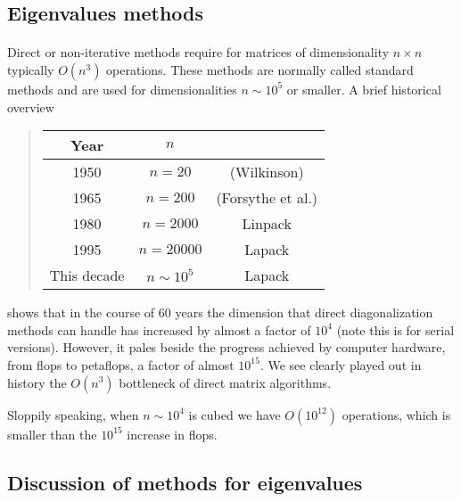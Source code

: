 \noindent



\subsection*{Eigenvalues methods}

\paragraph{}
Direct or non-iterative methods  require for matrices of dimensionality $n\times n$ typically $O(n^3)$ operations. These methods are normally called standard methods and are used for dimensionalities
$n \sim 10^5$ or smaller. A brief historical overview  


\begin{quote}
\begin{tabular}{ccc}
\hline
\multicolumn{1}{c}{ Year } & \multicolumn{1}{c}{ $n$ } & \multicolumn{1}{c}{  } \\
\hline
1950        & $n=20$       & (Wilkinson)       \\
1965        & $n=200$      & (Forsythe et al.) \\
1980        & $n=2000$     & Linpack           \\
1995        & $n=20000$    & Lapack            \\
This decade & $n\sim 10^5$ & Lapack            \\
\hline
\end{tabular}
\end{quote}

\noindent
shows that in the course of 60 years the dimension that  direct diagonalization methods can handle  has increased by almost a factor of
$10^4$ (note this is for serial versions). However, it pales beside the progress achieved by computer hardware, from flops to petaflops, a factor of almost $10^{15}$. We see clearly played out in history the $O(n^3)$ bottleneck  of direct matrix algorithms.

Sloppily speaking, when  $n\sim 10^4$ is cubed we have $O(10^{12})$ operations, which is smaller than the $10^{15}$ increase in flops.



\subsection*{Discussion of methods for eigenvalues}


